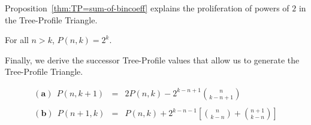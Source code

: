 Proposition~\ref{thm:TP=sum-of-bincoeff} explains the proliferation of
powers of $2$ in the Tree-Profile Triangle.

\begin{corol}
For all $n > k$, $P(n,k) = 2^k$.
\end{corol}

\medskip

Finally, we derive the successor Tree-Profile values that allow us to
generate the Tree-Profile Triangle.

\begin{prop}
\label{thm:successor-TP-values}
\begin{eqnarray*}
\nonumber
\mathbf{(a)} \ \
P(n, k+1) & = & 
  2 P(n,k) - 2^{k-n+1} {n \choose {k-n+1}} \\
\label{eq:successor-TP-values}
          &   & \\
\nonumber
\mathbf{(b)} \ \
P(n+1, k) & = &
  P(n,k) + 2^{k-n-1} \left[ {n \choose {k-n}} + {{n+1} \choose {k-n}} \right]
\end{eqnarray*}
\end{prop}

